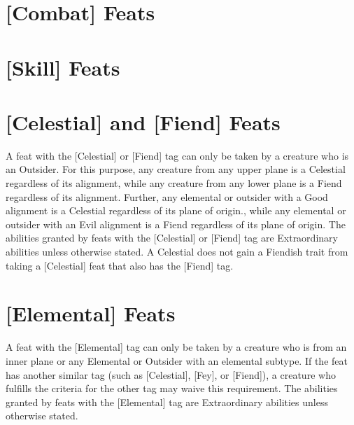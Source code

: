 \section{[Combat] Feats} \label{feats:combat}

	\begin{multicols}{2}

	

	\end{multicols}

	\section{[Skill] Feats}

	\begin{multicols}{2}

	

	\end{multicols}

\section{[Celestial] and [Fiend] Feats} \label{feats:outsider}

A feat with the [Celestial] or [Fiend] tag can only be taken by a creature who is an Outsider. For this purpose, any creature from any upper plane is a Celestial regardless of its alignment, while any creature from any lower plane is a Fiend regardless of its alignment. Further, any elemental or outsider with a Good alignment is a Celestial regardless of its plane of origin., while any elemental or outsider with an Evil alignment is a Fiend regardless of its plane of origin. The abilities granted by feats with the [Celestial] or [Fiend] tag are Extraordinary abilities unless otherwise stated. A Celestial does not gain a Fiendish trait from taking a [Celestial] feat that also has the [Fiend] tag.

	\begin{multicols}{2}

	

	\end{multicols}

\section{[Elemental] Feats} \label{feats:elemental}

A feat with the [Elemental] tag can only be taken by a creature who is from an inner plane or any Elemental or Outsider with an elemental subtype. If the feat has another similar tag (such as [Celestial], [Fey], or [Fiend]), a creature who fulfills the criteria for the other tag may waive this requirement. The abilities granted by feats with the [Elemental] tag are Extraordinary abilities unless otherwise stated.

